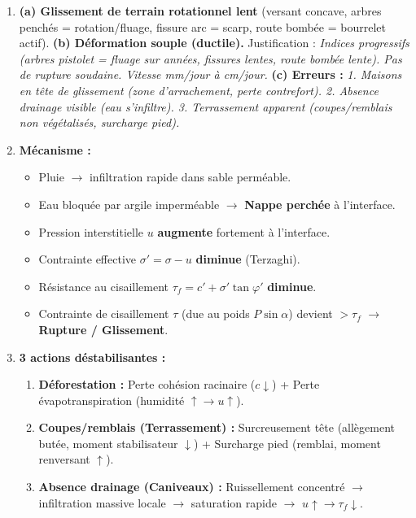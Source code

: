 \documentclass[11pt]{article}
\begin{document}
\begin{corrige}[Exercice n°1]
\begin{enumerate}
    \item \textbf{(a) Glissement de terrain rotationnel lent} (versant concave, arbres penchés = rotation/fluage, fissure arc = scarp, route bombée = bourrelet actif). 
    \textbf{(b) Déformation \textbf{souple} (ductile).} Justification : \textit{Indices progressifs (arbres pistolet = fluage sur années, fissures lentes, route bombée lente). Pas de rupture soudaine. Vitesse mm/jour à cm/jour.}
    \textbf{(c) Erreurs :} \textit{1. Maisons en tête de glissement (zone d'arrachement, perte contrefort). 2. Absence drainage visible (eau s'infiltre). 3. Terrassement apparent (coupes/remblais non végétalisés, surcharge pied).}
    \item \textbf{Mécanisme :} 
    \begin{itemize}
        \item Pluie $\rightarrow$ infiltration rapide dans sable perméable.
        \item Eau bloquée par argile imperméable $\rightarrow$ \textbf{Nappe perchée} à l'interface.
        \item Pression interstitielle $u$ \textbf{augmente} fortement à l'interface.
        \item Contrainte effective $\sigma' = \sigma - u$ \textbf{diminue} (Terzaghi).
        \item Résistance au cisaillement $\tau_f = c' + \sigma'\tan\varphi'$ \textbf{diminue}.
        \item Contrainte de cisaillement $\tau$ (due au poids $P\sin\alpha$) devient $> \tau_f$ $\rightarrow$ \textbf{Rupture / Glissement}.
    \end{itemize}
    \item \textbf{3 actions déstabilisantes :}
    \begin{enumerate}
        \item \textbf{Déforestation :} Perte cohésion racinaire ($c \downarrow$) + Perte évapotranspiration (humidité $\uparrow \rightarrow u \uparrow$).
        \item \textbf{Coupes/remblais (Terrassement) :} Surcreusement tête (allègement butée, moment stabilisateur $\downarrow$) + Surcharge pied (remblai, moment renversant $\uparrow$).
        \item \textbf{Absence drainage (Caniveaux) :} Ruissellement concentré $\rightarrow$ infiltration massive locale $\rightarrow$ saturation rapide $\rightarrow$ $u \uparrow \rightarrow \tau_f \downarrow$.

\end{enumerate}
\end{enumerate}
\end{corrige}
\end{document}
